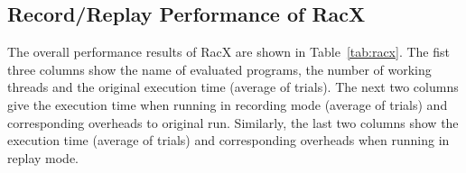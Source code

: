 \documentclass[10pt,onecolumn,letterpaper]{article}
\begin{document}
\subsection{Record/Replay Performance of RacX}
The overall performance results of RacX are shown in
Table~\ref{tab:racx}. The fist three columns show the name of
evaluated programs, the number of working threads and the original
execution time (average of  trials). The next two columns give
the execution time when running in recording mode (average of 
trials) and corresponding overheads to original run. Similarly, the
last two columns show the execution time (average of  trials) and
corresponding overheads when running in replay mode.

\begin{table}
\caption{Performance of RacX when running with record- and replay-
mode compared with original execution. We vary the number of threads
from 1 to 16 to demonstrates the scalability of
RacX.}\label{tab:racx}
\end{table}
\end{document}
